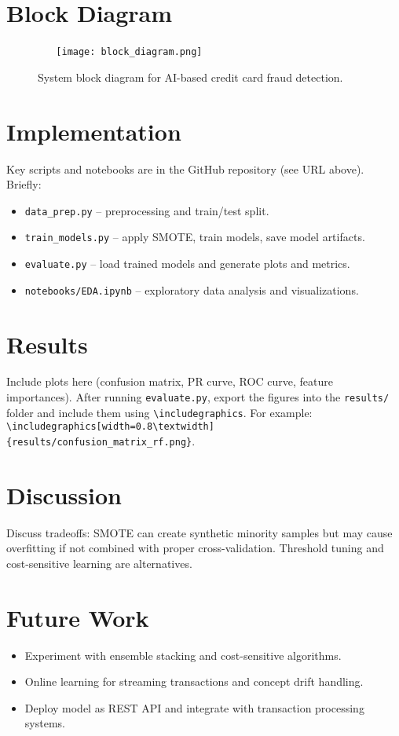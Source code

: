 \documentclass[12pt,a4paper]{article}
\begin{document}
\section{Block Diagram}
\begin{figure}[H]
  \centering
  \texttt{[image: block\_diagram.png]} %
  \caption{System block diagram for AI-based credit card fraud detection.} %
\end{figure}

\section{Implementation}
Key scripts and notebooks are in the GitHub repository (see URL above). Briefly:
\begin{itemize}
  \item \texttt{data\_prep.py} -- preprocessing and train/test split.
  \item \texttt{train\_models.py} -- apply SMOTE, train models, save model artifacts.
  \item \texttt{evaluate.py} -- load trained models and generate plots and metrics.
  \item \texttt{notebooks/EDA.ipynb} -- exploratory data analysis and visualizations.
\end{itemize}

\section{Results}
Include plots here (confusion matrix, PR curve, ROC curve, feature importances). After running \texttt{evaluate.py}, export the figures into the \texttt{results/} folder and include them using \texttt{\textbackslash includegraphics}. For example: \texttt{\textbackslash includegraphics[width=0.8\textbackslash textwidth]\{results/confusion\_matrix\_rf.png\}}.

\section{Discussion}
Discuss tradeoffs: SMOTE can create synthetic minority samples but may cause overfitting if not combined with proper cross-validation. Threshold tuning and cost-sensitive learning are alternatives.

\section{Future Work}
\begin{itemize}
  \item Experiment with ensemble stacking and cost-sensitive algorithms.
  \item Online learning for streaming transactions and concept drift handling.
  \item Deploy model as REST API and integrate with transaction processing systems.
\end{itemize}
\end{document}
